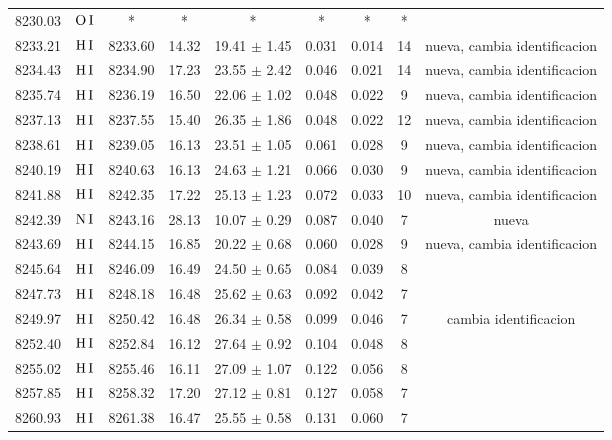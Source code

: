 \documentclass{article}
\begin{document}
\begin{table*}
\begin{adjustbox}{width=\textwidth}
\begin{tabular}{ccccccccc}
8230.03 & $\mbox{O}\thinspace \mbox{I}$ & * & * & * & * & * & * &  \\
8233.21 & $\mbox{H}\thinspace \mbox{I}$ & 8233.60 & 14.32 & 19.41 $\pm$ 1.45 & 0.031 & 0.014 & 14 &  nueva, cambia identificacion \\
8234.43 & $\mbox{H}\thinspace \mbox{I}$ & 8234.90 & 17.23 & 23.55 $\pm$ 2.42 & 0.046 & 0.021 & 14 &  nueva, cambia identificacion \\
8235.74 & $\mbox{H}\thinspace \mbox{I}$ & 8236.19 & 16.50 & 22.06 $\pm$ 1.02 & 0.048 & 0.022 & 9 &  nueva, cambia identificacion \\
8237.13 & $\mbox{H}\thinspace \mbox{I}$ & 8237.55 & 15.40 & 26.35 $\pm$ 1.86 & 0.048 & 0.022 & 12 &  nueva, cambia identificacion \\
8238.61 & $\mbox{H}\thinspace \mbox{I}$ & 8239.05 & 16.13 & 23.51 $\pm$ 1.05 & 0.061 & 0.028 & 9 &  nueva, cambia identificacion \\
8240.19 & $\mbox{H}\thinspace \mbox{I}$ & 8240.63 & 16.13 & 24.63 $\pm$ 1.21 & 0.066 & 0.030 & 9 &  nueva, cambia identificacion \\
8241.88 & $\mbox{H}\thinspace \mbox{I}$ & 8242.35 & 17.22 & 25.13 $\pm$ 1.23 & 0.072 & 0.033 & 10 &  nueva, cambia identificacion \\
8242.39 & $\mbox{N}\thinspace \mbox{I}$ & 8243.16 & 28.13 & 10.07 $\pm$ 0.29 & 0.087 & 0.040 & 7 &  nueva \\
8243.69 & $\mbox{H}\thinspace \mbox{I}$ & 8244.15 & 16.85 & 20.22 $\pm$ 0.68 & 0.060 & 0.028 & 9 &  nueva, cambia identificacion \\
8245.64 & $\mbox{H}\thinspace \mbox{I}$ & 8246.09 & 16.49 & 24.50 $\pm$ 0.65 & 0.084 & 0.039 & 8 &  \\
8247.73 & $\mbox{H}\thinspace \mbox{I}$ & 8248.18 & 16.48 & 25.62 $\pm$ 0.63 & 0.092 & 0.042 & 7 &  \\
8249.97 & $\mbox{H}\thinspace \mbox{I}$ & 8250.42 & 16.48 & 26.34 $\pm$ 0.58 & 0.099 & 0.046 & 7 &  cambia identificacion \\
8252.40 & $\mbox{H}\thinspace \mbox{I}$ & 8252.84 & 16.12 & 27.64 $\pm$ 0.92 & 0.104 & 0.048 & 8 &  \\
8255.02 & $\mbox{H}\thinspace \mbox{I}$ & 8255.46 & 16.11 & 27.09 $\pm$ 1.07 & 0.122 & 0.056 & 8 &  \\
8257.85 & $\mbox{H}\thinspace \mbox{I}$ & 8258.32 & 17.20 & 27.12 $\pm$ 0.81 & 0.127 & 0.058 & 7 &  \\
8260.93 & $\mbox{H}\thinspace \mbox{I}$ & 8261.38 & 16.47 & 25.55 $\pm$ 0.58 & 0.131 & 0.060 & 7 &  \\

\end{tabular}
\end{adjustbox}
\end{table*}
\end{document}
